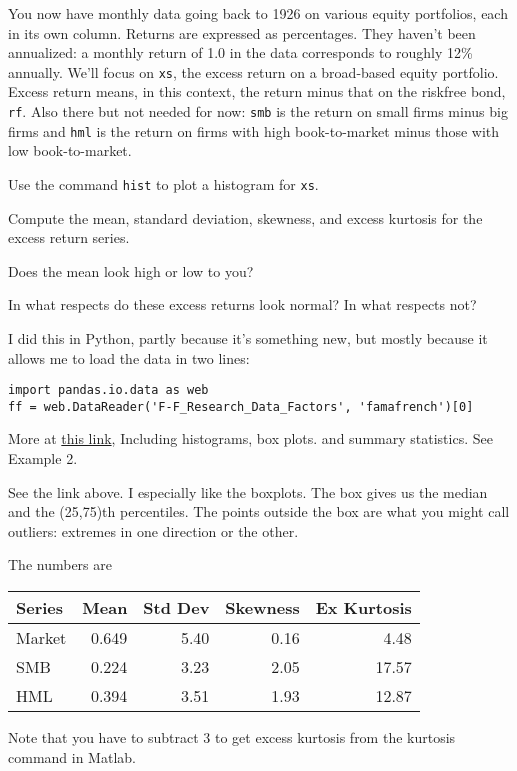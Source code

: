 \documentclass[11pt]{exam}
\begin{document}
\begin{questions}
You now have  monthly data going back to 1926 on various equity portfolios,
each in its own column.
Returns are expressed as percentages.
They haven't been annualized: a monthly return of 1.0 in the data
corresponds to roughly 12\% annually.
We'll focus on {\tt xs}, the excess return on a broad-based equity portfolio.
Excess return means, in this context, the return minus that on the riskfree bond, {\tt rf}.
Also there but not needed for now:  {\tt smb} is the return on small firms minus big firms
and {\tt hml} is the return on firms with high book-to-market minus
those with low book-to-market.
%
\begin{parts}
\item Use the command {\tt hist} to plot a histogram for {\tt xs}.
\item Compute the mean, standard deviation, skewness, and excess kurtosis
for the excess return series.
\item Does the mean look high or low to you?
\item  In what respects do these excess returns look normal?  In what respects not?
\end{parts}

\begin{solution}
I did this in Python, partly because it's something new, but mostly
because it allows me to load the data in two lines:
\begin{verbatim}
import pandas.io.data as web
ff = web.DataReader('F-F_Research_Data_Factors', 'famafrench')[0]
\end{verbatim}
More at
\href{https://www.wakari.io/sharing/bundle/DaveBackus/Bootcamp_1_Examples}{this link}, 
Including histograms, box plots. and summary statistics.  See Example 2.

\begin{parts}
\item See the link above.  I especially like the boxplots.  The box gives us the median
and the (25,75)th percentiles.
The points outside the box are what you might call outliers:  extremes in one direction or the other.  
\item The numbers are
%
\begin{center}
\begin{tabular}{lrrrr}
\toprule
Series  &  Mean & Std Dev & Skewness & Ex Kurtosis \\
\midrule
Market  & 0.649 & 5.40 & 0.16 & 4.48 \\
SMB     & 0.224 & 3.23 & 2.05  & 17.57 \\
HML     & 0.394 & 3.51 & 1.93  & 12.87 \\
\bottomrule
\end{tabular}
\end{center}
%
Note that you have to subtract 3 to get excess kurtosis from the kurtosis command in Matlab.  


\end{parts}
\end{solution}
\end{questions}
\end{document}
